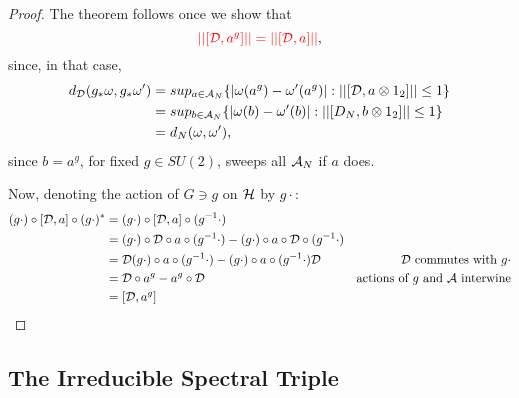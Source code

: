 \begin{proof}
The theorem follows once we show that 
\begin{equation}\label{normEqualDiracAction}
    \textcolor{red}{||[\mathcal D, a^g]|| = ||[\mathcal D, a]||},
\end{equation} since, in that case,
\begin{align*}
d_\mathcal D(g_* \omega, g_* \omega') &= sup_{a \in \mathcal A_N}\{ |\omega(a^g) - \omega'(a^g)|: ||[\mathcal D, a \otimes 1_2]|| \leq 1 \} \\
    &= sup_{b \in \mathcal A_N}\{ |\omega(b) - \omega'(b)|: ||[D_N, b \otimes 1_2]|| \leq 1 \} \\
    &= d_N(\omega, \omega'),
\end{align*}
since $b = a^g$, for fixed $g \in SU(2)$, sweeps all $\mathcal A_N$ if $a$ does.

Now, denoting the action of $G \ni g$ on $\mathcal H$ by $g \cdot$:
\begin{align*}
    (g \cdot) \circ [\mathcal D, a]\circ (g\cdot )^* &= (g \cdot) \circ [\mathcal D, a]\circ (g^{-1}\cdot )\\
        &= (g \cdot) \circ \mathcal D \circ a \circ (g^{-1}\cdot ) - (g \cdot) \circ a \circ  \mathcal D \circ (g^{-1}\cdot )\\
        &= \mathcal D (g \cdot) \circ a\circ (g^{-1}\cdot ) - (g \cdot) \circ a\circ (g^{-1}\cdot ) \mathcal D & \text{$\mathcal D$ commutes with $g\cdot$} \\
        &= \mathcal D \circ a^g - a^g \circ \mathcal D & \text{actions of $g$ and $\mathcal A$ interwine} \\
        & = [\mathcal D, a^g]
\end{align*} 
\end{proof}

\subsection{The Irreducible Spectral Triple}
 
 


